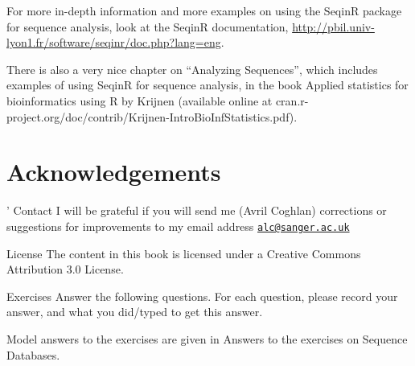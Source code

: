 \documentclass[
]{book}
\begin{document}
For more in-depth information and more examples on using the SeqinR package for sequence analysis, look at the SeqinR documentation, \url{http://pbil.univ-lyon1.fr/software/seqinr/doc.php?lang=eng}.

There is also a very nice chapter on ``Analyzing Sequences'', which includes examples of using SeqinR for sequence analysis, in the book Applied statistics for bioinformatics using R by Krijnen (available online at cran.r-project.org/doc/contrib/Krijnen-IntroBioInfStatistics.pdf).

\hypertarget{acknowledgements-1}{%
\section{Acknowledgements}\label{acknowledgements-1}}

'
Contact
I will be grateful if you will send me (Avril Coghlan) corrections or suggestions for improvements to my email address \href{mailto:alc@sanger.ac.uk}{\nolinkurl{alc@sanger.ac.uk}}

License
The content in this book is licensed under a Creative Commons Attribution 3.0 License.

Exercises
Answer the following questions. For each question, please record your answer, and what you did/typed to get this answer.

Model answers to the exercises are given in Answers to the exercises on Sequence Databases.
\end{document}

